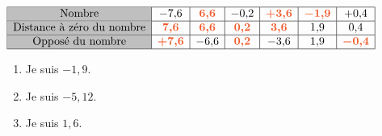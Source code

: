 \documentclass[a4paper,12pt]{report}
\begin{document}
\begin{Correction}
\begin{EXO}{}{}
\begin{enumerate}[]
\end{enumerate}

\end{EXO}

\begin{EXO}{}{}

 $\renewcommand{\arraystretch}{1}
\begin{array}{|c|c|c|c|c|c|c|}
\hline
\cellcolor{lightgray} \text{Nombre} & -7{,}6 & {\color[HTML]{f15929}\boldsymbol{6{,}6}} & -0{,}2 & {\color[HTML]{f15929}\boldsymbol{+3{,}6}} & {\color[HTML]{f15929}\boldsymbol{-1{,}9}} & +0{,}4\\
\hline
\cellcolor{lightgray} \text{Distance à zéro du nombre} & {\color[HTML]{f15929}\boldsymbol{7{,}6}} & {\color[HTML]{f15929}\boldsymbol{6{,}6}} & {\color[HTML]{f15929}\boldsymbol{0{,}2}} & {\color[HTML]{f15929}\boldsymbol{3{,}6}} & 1{,}9 & 0{,}4\\
\hline
\cellcolor{lightgray} \text{Opposé du nombre} & {\color[HTML]{f15929}\boldsymbol{+7{,}6}} & -6{,}6 & {\color[HTML]{f15929}\boldsymbol{0{,}2}} & -3{,}6 & 1{,}9 & {\color[HTML]{f15929}\boldsymbol{-0{,}4}}\\
\hline
\end{array}
\renewcommand{\arraystretch}{1}$

\end{EXO}

\begin{EXO}{}{}

\begin{enumerate}[]
\item Je suis $-1{,}9$.
\item Je suis $-5{,}12$.
\item Je suis $1{,}6$.
\end{enumerate}

\end{EXO}

\begin{EXO}{}{}
\begin{multicols}{3}


\end{multicols}
\end{EXO}
\end{Correction}
\end{document}

